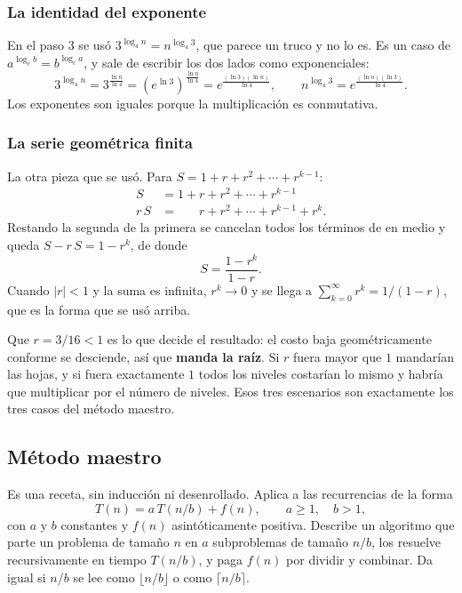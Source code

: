 \documentclass[11pt,letterpaper]{article}
\begin{document}
\subsubsection*{La identidad del exponente}

En el paso 3 se usó $3^{\log_4 n} = n^{\log_4 3}$, que parece un
truco y no lo es. Es un caso de
$a^{\log_c b} = b^{\log_c a}$, y sale de escribir los dos lados como
exponenciales:
\[
    3^{\log_4 n} = 3^{\frac{\ln n}{\ln 4}}
                 = \left(e^{\ln 3}\right)^{\frac{\ln n}{\ln 4}}
                 = e^{\frac{(\ln 3)(\ln n)}{\ln 4}} ,
    \qquad
    n^{\log_4 3} = e^{\frac{(\ln n)(\ln 3)}{\ln 4}} .
\]
Los exponentes son iguales porque la multiplicación es conmutativa.

\subsubsection*{La serie geométrica finita}

La otra pieza que se usó. Para $S = 1 + r + r^2 + \cdots + r^{k-1}$:
\begin{align*}
  S    &= 1 + r + r^2 + \cdots + r^{k-1} \\
  r\,S &= \phantom{1 + {}} r + r^2 + \cdots + r^{k-1} + r^k .
\end{align*}
Restando la segunda de la primera se cancelan todos los términos de en
medio y queda $S - r\,S = 1 - r^k$, de donde
\[
    S = \frac{1 - r^k}{1 - r} .
\]
Cuando $|r| < 1$ y la suma es infinita, $r^k \to 0$ y se llega a
$\sum_{k=0}^{\infty} r^k = 1/(1-r)$, que es la forma que se usó
arriba.

\begin{idea}
  Que $r = 3/16 < 1$ es lo que decide el resultado: el costo baja
  geométricamente conforme se desciende, así que \textbf{manda la
  raíz}. Si $r$ fuera mayor que $1$ mandarían las hojas, y si fuera
  exactamente $1$ todos los niveles costarían lo mismo y habría que
  multiplicar por el número de niveles. Esos tres escenarios son
  exactamente los tres casos del método maestro.
\end{idea}


\subsection*{Método maestro}

Es una receta, sin inducción ni desenrollado. Aplica a las
recurrencias de la forma
\[
    T(n) = a\,T(n/b) + f(n) ,
    \qquad a \geq 1 , \quad b > 1 ,
\]
con $a$ y $b$ constantes y $f(n)$ asintóticamente positiva. Describe
un algoritmo que parte un problema de tamaño $n$ en $a$ subproblemas
de tamaño $n/b$, los resuelve recursivamente en tiempo $T(n/b)$, y
paga $f(n)$ por dividir y combinar. Da igual si $n/b$ se lee como
$\lfloor n/b \rfloor$ o como $\lceil n/b \rceil$.
\end{document}
